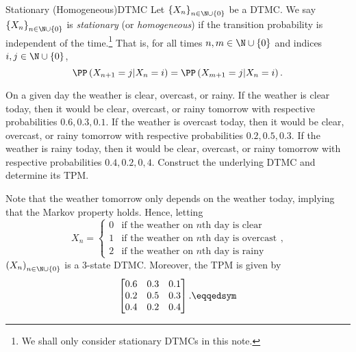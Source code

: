 \documentclass[stat333]{subfiles}
\begin{document}
    \begin{definition}{Stationary (Homogeneous)}{DTMC}
        Let $\left\lbrace X_n \right\rbrace^{}_{n\in\N\cup\left\lbrace 0 \right\rbrace}$ be a DTMC. We say $\left\lbrace X_n \right\rbrace^{}_{n\in\N\cup\left\lbrace 0 \right\rbrace}$ is \emph{stationary} (or \emph{homogeneous}) if the transition probability is independent of the time.\footnote{We shall only consider stationary DTMCs in this note.} That is, for all times $n,m\in\N\cup\left\lbrace 0 \right\rbrace$ and indices $i,j\in\N\cup\left\lbrace 0 \right\rbrace$,
        \begin{equation*}
            \PP\left( X_{n+1}=j|X_n=i \right) = \PP\left( X_{m+1}=j|X_n=i \right).
        \end{equation*}
    \end{definition}


    \ex On a given day the weather is clear, overcast, or rainy. 
    If the weather is clear today, then it would be clear, overcast, or rainy tomorrow with respective probabilities $0.6,0.3,0.1$. 
    If the weather is overcast today, then it would be clear, overcast, or rainy tomorrow with respective probabilities $0.2,0.5,0.3$. 
    If the weather is rainy today, then it would be clear, overcast, or rainy tomorrow with respective probabilities $0.4,0.2,0,4$. 
    Construct the underlying DTMC and determine its TPM.

    \begin{subproof}[Answer]
        Note that the weather tomorrow only depends on the weather today, implying that the Markov property holds. Hence, letting
        \begin{equation*}
            X_n = 
            \begin{cases} 
                0 & \text{if the weather on $n$th day is clear}\\
                1 & \text{if the weather on $n$th day is overcast}\\
                2 & \text{if the weather on $n$th day is rainy}
            \end{cases},
        \end{equation*}
        $\left( X_{n} \right)^{}_{n\in\N\cup\left\lbrace 0 \right\rbrace}$ is a $3$-state DTMC. Moreover, the TPM is given by
        \begin{equation*}
            \begin{bmatrix}
            	0.6 & 0.3 & 0.1 \\
            	0.2 & 0.5 & 0.3 \\
            	0.4 & 0.2 & 0.4 \\
            \end{bmatrix}. \eqqedsym
        \end{equation*}
    \end{subproof}
\end{document}
